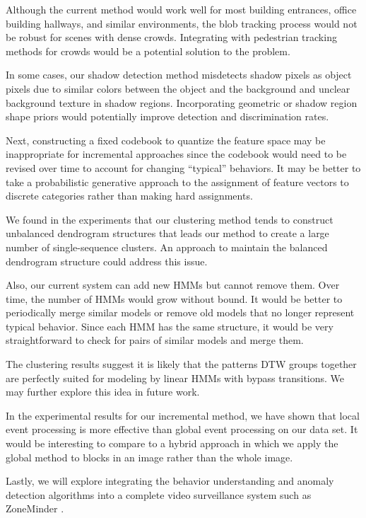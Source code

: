 Although the current method would work well for most building entrances, office
building hallways, and similar environments, the blob tracking process would
not be robust for scenes with dense crowds. Integrating with pedestrian
tracking methods for crowds  would be a potential
solution to the problem.

In some cases, our shadow detection method misdetects shadow pixels as object
pixels due to similar colors between the object and the background and unclear
background texture in shadow regions. Incorporating geometric or shadow region
shape priors would potentially improve detection and discrimination rates.

Next, constructing a fixed codebook to quantize the feature space may be
inappropriate for incremental approaches since the codebook would need to be
revised over time to account for changing ``typical'' behaviors.  It may be
better to take a probabilistic generative approach to the assignment of feature
vectors to discrete categories rather than making hard assignments.

We found in the experiments that our clustering method tends to construct
unbalanced dendrogram structures that leads our method to create a large number
of single-sequence clusters. An approach to maintain the balanced dendrogram
structure could address this issue. 

Also, our current system can add new HMMs but cannot remove them. Over time,
the number of HMMs would grow without bound.  It would be better to
periodically merge similar models or remove old models that no longer represent
typical behavior. Since each HMM has the same structure, it would be very
straightforward to check for pairs of similar models and merge them.

The clustering results suggest it is likely that the patterns DTW groups
together are perfectly suited for modeling by linear HMMs with bypass
transitions. We may further explore this idea in future work.

In the experimental results for our incremental method, we have shown that
local event processing is more effective than global event processing on our
data set.  It would be interesting to compare to a hybrid approach in which we
apply the global method to blocks in an image rather than the whole image.  

Lastly, we will explore integrating the behavior understanding and anomaly
detection algorithms into a complete video surveillance system such as
ZoneMinder .

\FloatBarrier

